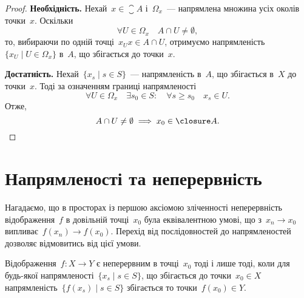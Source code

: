 \begin{proof}
    \textbf{Необхідність.} Нехай~$x \in \closure A$ і~$\Omega_x$~--- напрямлена множина усіх околів точки~$x$. Оскільки
    \begin{equation*}
        \forall U \in \Omega_x \quad A \cap U \ne \emptyset,
    \end{equation*}
    то, вибираючи по одній точці~$x_U x \in A \cap U$, отримуємо напрямленість~$\{x_U \mid U \in \Omega_x\}$ в~$A$, що збігається до точки~$x$. 

    \textbf{Достатність.} Нехай~$\{x_s \mid s \in S\}$~--- напрямленість в~$A$, що збігається в~$X$ до точки~$x$. Тоді за означенням границі напрямленості
    \begin{equation*}
        \forall U \in \Omega_x \quad \exists s_0 \in S: \quad \forall s \ge s_0 \quad x_s \in U.
    \end{equation*}
    Отже,
    \begin{equation*}
        A \cap U \ne \emptyset \implies x_0 \in \closure A. \qedhere
    \end{equation*}
\end{proof}

\section{Напрямленості та неперервність}

\begin{remark}
    Нагадаємо, що в просторах із першою аксіомою зліченності неперервність відображення~$f$ в довільній точці~$x_0$ була еквівалентною умові, що з~$x_n \to x_0$ випливає~$f(x_n) \to f(x_0)$. Перехід від послідовностей до напрямленостей дозволяє відмовитись від цієї умови.
\end{remark}

\begin{theorem}
    \label{th:net-continuity-criterion}
    Відображення~$f: X \to Y$ є неперервним в точці~$x_0$ тоді і лише тоді, коли для будь-якої напрямленості~$\{x_s \mid s \in S\}$, що збігається до точки~$x_0 \in X$ напрямленість~$\{f(x_s) \mid s \in S\}$ збігається то точки~$f(x_0) \in Y$.
\end{theorem}

